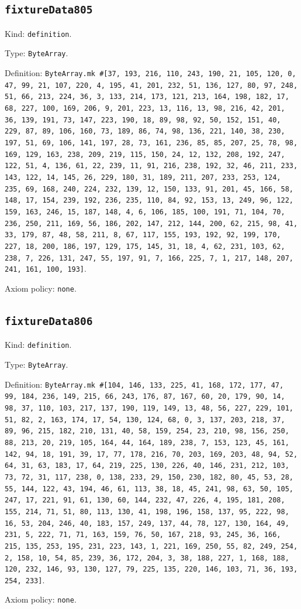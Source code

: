 \documentclass[11pt]{article}
\begin{document}
\subsection*{\texttt{fixtureData805}}
\noindent Kind: \texttt{definition}.\par
\noindent Type: \texttt{ByteArray}.\par
\noindent Definition: \texttt{ByteArray.mk \#[37, 193, 216, 110, 243, 190, 21, 105, 120, 0, 47, 99, 21, 107, 220, 4, 195, 41, 201, 232, 51, 136, 127, 80, 97, 248, 51, 66, 213, 224, 36, 3, 133, 214, 173, 121, 213, 164, 198, 182, 17, 68, 227, 100, 169, 206, 9, 201, 223, 13, 116, 13, 98, 216, 42, 201, 36, 139, 191, 73, 147, 223, 190, 18, 89, 98, 92, 50, 152, 151, 40, 229, 87, 89, 106, 160, 73, 189, 86, 74, 98, 136, 221, 140, 38, 230, 197, 51, 69, 106, 141, 197, 28, 73, 161, 236, 85, 85, 207, 25, 78, 98, 169, 129, 163, 238, 209, 219, 115, 150, 24, 12, 132, 208, 192, 247, 122, 51, 4, 136, 61, 22, 239, 11, 91, 216, 238, 192, 32, 46, 211, 233, 143, 122, 14, 145, 26, 229, 180, 31, 189, 211, 207, 233, 253, 124, 235, 69, 168, 240, 224, 232, 139, 12, 150, 133, 91, 201, 45, 166, 58, 148, 17, 154, 239, 192, 236, 235, 110, 84, 92, 153, 13, 249, 96, 122, 159, 163, 246, 15, 187, 148, 4, 6, 106, 185, 100, 191, 71, 104, 70, 236, 250, 211, 169, 56, 186, 202, 147, 212, 144, 200, 62, 215, 98, 41, 33, 179, 87, 48, 58, 211, 8, 67, 117, 155, 193, 192, 92, 199, 170, 227, 18, 200, 186, 197, 129, 175, 145, 31, 18, 4, 62, 231, 103, 62, 238, 7, 226, 131, 247, 55, 197, 91, 7, 166, 225, 7, 1, 217, 148, 207, 241, 161, 100, 193]}.\par
\noindent Axiom policy: \texttt{none}.\par
\subsection*{\texttt{fixtureData806}}
\noindent Kind: \texttt{definition}.\par
\noindent Type: \texttt{ByteArray}.\par
\noindent Definition: \texttt{ByteArray.mk \#[104, 146, 133, 225, 41, 168, 172, 177, 47, 99, 184, 236, 149, 215, 66, 243, 176, 87, 167, 60, 20, 179, 90, 14, 98, 37, 110, 103, 217, 137, 190, 119, 149, 13, 48, 56, 227, 229, 101, 51, 82, 2, 163, 174, 17, 54, 130, 124, 68, 0, 3, 137, 203, 218, 37, 89, 96, 215, 182, 210, 131, 40, 58, 159, 254, 23, 210, 98, 156, 250, 88, 213, 20, 219, 105, 164, 44, 164, 189, 238, 7, 153, 123, 45, 161, 142, 94, 18, 191, 39, 17, 77, 178, 216, 70, 203, 169, 203, 48, 94, 52, 64, 31, 63, 183, 17, 64, 219, 225, 130, 226, 40, 146, 231, 212, 103, 73, 72, 31, 117, 238, 0, 138, 233, 29, 150, 230, 182, 80, 45, 53, 28, 55, 144, 122, 43, 194, 46, 61, 113, 38, 18, 45, 241, 98, 63, 50, 105, 247, 17, 221, 91, 61, 130, 60, 144, 232, 47, 226, 4, 195, 181, 208, 155, 214, 71, 51, 80, 113, 130, 41, 198, 196, 158, 137, 95, 222, 98, 16, 53, 204, 246, 40, 183, 157, 249, 137, 44, 78, 127, 130, 164, 49, 231, 5, 222, 71, 71, 163, 159, 76, 50, 167, 218, 93, 245, 36, 166, 215, 135, 253, 195, 231, 223, 143, 1, 221, 169, 250, 55, 82, 249, 254, 2, 158, 10, 54, 85, 239, 36, 172, 204, 3, 38, 188, 227, 1, 168, 188, 120, 232, 146, 93, 130, 127, 79, 225, 135, 220, 146, 103, 71, 36, 193, 254, 233]}.\par
\noindent Axiom policy: \texttt{none}.\par
\end{document}
